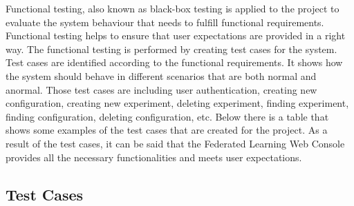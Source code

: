 Functional testing, also known as black-box testing is applied to the project to evaluate the system behaviour that needs to fulfill functional requirements.
Functional testing helps to ensure that user expectations are provided in a right way. The functional testing is performed by creating test cases for the system.\\

Test cases are identified according to the functional requirements. It shows how the system should behave in different scenarios that are both normal and anormal.
Those test cases are including user authentication, creating new configuration, creating new experiment, deleting experiment, finding experiment, finding configuration, deleting configuration, etc.
Below there is a table that shows some examples of the test cases that are created for the project. As a result of the test cases, it can be said that the Federated Learning Web Console provides all the
necessary functionalities and meets user expectations.

\subsection{Test Cases}


